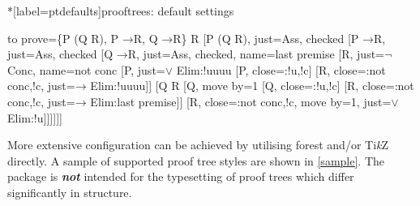 \documentclass[10pt,british,a4paper,doc2]{ltxdoc}
\newcommand*\pkg[1]{\textsf{#1}}
\newcommand*{\lif}{\ensuremath{\mathbin{\rightarrow}}}
\newcommand*\TikZ{Ti\emph{k}Z}
\begin{document}
\begin{codcoeden}*[label=ptdefaults]{\pkg{prooftrees}: default settings}
\begin{tableau}
  {
    to prove={\{P \vee (Q \vee \lnot R), P \lif \lnot R, Q \lif \lnot R\} \sststile{}{} \lnot R}
  }
  [P \vee (Q \vee \lnot R),  just=Ass, checked
    [P \lif \lnot R,  just=Ass, checked
      [Q \lif \lnot R,  just=Ass, checked, name=last premise
        [\lnot\lnot R, just={$\lnot$ Conc}, name=not conc
          [P,  just={$\vee$ Elim:!uuuu}
            [\lnot P, close={:!u,!c}]
            [\lnot R,  close={:not conc,!c}, just={$\lif$ Elim:!uuuu}]]
          [Q \vee \lnot R
            [Q, move by=1
              [\lnot Q, close={:!u,!c}]
              [\lnot R,  close={:not conc,!c}, just={$\lif$ Elim:last premise}]]
            [\lnot R, close={:not conc,!c}, move by=1, just={$\vee$ Elim:!u}]]]]]]
\end{tableau}
\end{codcoeden}
More extensive configuration can be achieved by utilising \pkg{forest} \autocite{saso-forest-manual} and/or \TikZ{} \autocite{tantau-tikz-pgf-manual} directly.
A sample of supported proof tree styles are shown in \cref{sample}.
The package is \emph{\bfseries not} intended for the typesetting of proof trees which differ significantly in structure.
\clearpage
\thispagestyle{plain}%
\end{document}

